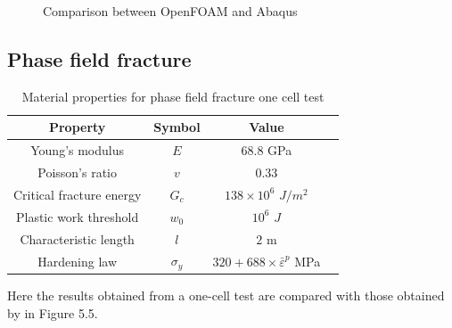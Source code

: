 \documentclass[sn-mathphys,Numbered,draft]{sn-jnl}%
\begin{document}
\begin{appendices}
\begin{figure}[htbp]
		
		\caption{Comparison between OpenFOAM and Abaqus}
	\label{label_for_entire_figure}
\end{figure}

\FloatBarrier

\subsection{Phase field fracture}
\begin{table}[htb]
	\centering
		\begin{tabular}{cccc} \hline
			Property & Symbol & Value  \\ \hline 
			Young's modulus & $E$ & $68.8$ GPa \\
			Poisson's ratio & $v$ & $0.33$   \\
			Critical fracture energy & $G_c$ & $138\times10^6$ $J/m^2$ \\
   		Plastic work threshold & $w_0$ & $10^6$ $J$ \\
			Characteristic length & $l$ & $2$ m   \\
			Hardening law & $\sigma_y$ & $320+688\times{\bar{\varepsilon}}^p$ MPa  \\
			\hline
		\end{tabular}
	\caption{Material properties for phase field fracture one cell test}
	\label{tab:material_properties}
\end{table}

Here the results obtained from a one-cell test are compared with those obtained by \citet{borden_phase-field_2016} in Figure 5.5. 


\end{appendices}
\end{document}
